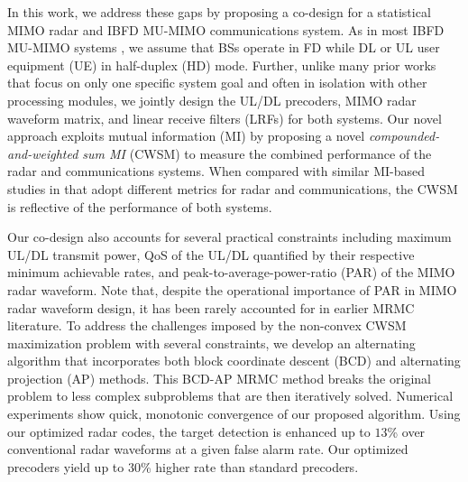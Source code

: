 \documentclass[10pt,journal]{IEEEtran}
\theoremstyle{definition}
\begin{document}
In this work, we address these gaps by proposing a co-design for a statistical MIMO radar and IBFD MU-MIMO communications system. As in most IBFD MU-MIMO systems \cite{biswas2018fdqos,singh2018transceiver,FD_WMMSE}, we assume that BSs operate in FD while DL or UL user equipment (UE) in half-duplex (HD) mode. Further, unlike many prior works that focus on only one specific system goal and often in isolation with other processing modules, we jointly design the UL/DL precoders, MIMO radar waveform matrix, and linear receive filters (LRFs) for both systems. Our novel approach exploits mutual information (MI) by proposing a novel \textit{compounded-and-weighted sum MI} (CWSM) to measure the combined performance of the radar and communications systems. When compared with similar MI-based studies in \cite{biswas2018fdqos,singh2018transceiver,he2019performance} that adopt different metrics for radar and communications, the CWSM is reflective of the performance of both systems. 

Our co-design also accounts for several practical constraints including maximum UL/DL transmit power, QoS of the UL/DL quantified by their respective minimum achievable rates, and peak-to-average-power-ratio (PAR) of the MIMO radar waveform. %
Note that, despite the operational importance of PAR in MIMO radar waveform design, it has been rarely accounted for in earlier MRMC literature. To address the challenges imposed by the non-convex CWSM maximization problem with several constraints, we develop an alternating algorithm that incorporates both block coordinate descent (BCD) and alternating projection (AP) methods. This BCD-AP MRMC method breaks the original problem to less complex subproblems that are then iteratively solved. Numerical experiments show quick, monotonic convergence of our proposed algorithm. Using our optimized radar codes, the target detection is enhanced up to $13$\% over conventional radar waveforms at a given false alarm rate. Our optimized precoders yield up to $30$\% higher rate than standard precoders. %
\end{document}
